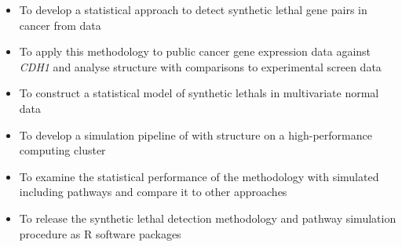 

  \begin{itemize}
   \item To develop a statistical approach to detect \gls{synthetic lethal} gene pairs in cancer from  data

   \bigskip
   
   \item To apply this methodology to public cancer \gls{gene expression} data against \textit{CDH1} and analyse  structure with comparisons to experimental screen data

   \bigskip
   
   \item To construct a statistical model of \glspl{synthetic lethal} in multivariate normal  data
 
   \bigskip
   
   \item To develop a simulation pipeline of  with  structure on a high-performance computing cluster 

   \bigskip
   
   \item To examine the statistical performance of the methodology with simulated  including pathways and compare it to other approaches

   \bigskip
   
   \item To release the \gls{synthetic lethal} detection methodology and pathway simulation procedure as R software packages
   
  \end{itemize}
\fi
  
